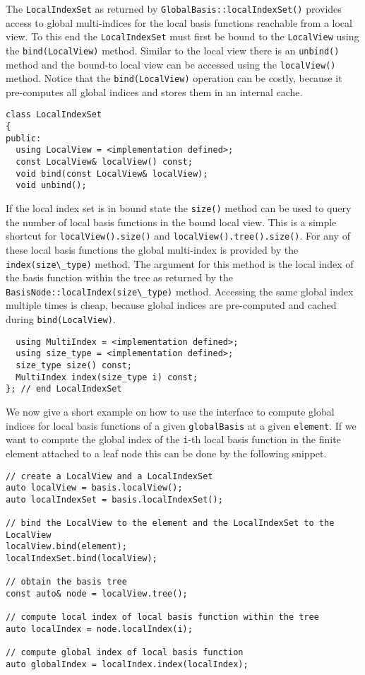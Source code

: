 \documentclass[a4paper,10pt,headings=normal,bibliography=totoc]{scrartcl}
\newcommand{\cpp}[1]{\lstinline[basicstyle=\ttfamily]!#1!}
\begin{document}
The \cpp{LocalIndexSet} as returned by \cpp{GlobalBasis::localIndexSet()}
provides access to global multi-indices for the
local basis functions reachable from a local view.
To this end the \cpp{LocalIndexSet} must
first be bound to the \cpp{LocalView} using
the \cpp{bind(LocalView)} method. Similar to the
local view there is an \cpp{unbind()} method
and the bound-to local view can be accessed
using the \cpp{localView()} method.
Notice that the \cpp{bind(LocalView)} operation
can be costly, because it pre-computes
all global indices and stores them in an internal cache.

\begin{lstlisting}
class LocalIndexSet
{
public:
  using LocalView = <implementation defined>;
  const LocalView& localView() const;
  void bind(const LocalView& localView);
  void unbind();
\end{lstlisting}

If the local index set is in bound state
the \cpp{size()} method can be used to query
the number of local basis functions in the
bound local view. This is a simple shortcut for
\cpp{localView().size()} and \cpp{localView().tree().size()}.
For any of these local basis functions the global
multi-index is provided by the \cpp{index(size\_type)}
method. The argument for this method is the local
index of the basis function within the tree as
returned by the \cpp{BasisNode::localIndex(size\_type)}
method.
Accessing the same global index multiple times
is cheap, because global indices are pre-computed
and cached during \cpp{bind(LocalView)}.

\begin{lstlisting}
  using MultiIndex = <implementation defined>;
  using size_type = <implementation defined>;
  size_type size() const;
  MultiIndex index(size_type i) const;
}; // end LocalIndexSet
\end{lstlisting}

We now give a short example on how to use the interface
to compute global indices for local basis functions
of a given \cpp{globalBasis} at a given \cpp{element}.
If we want to compute the global index of the \cpp{i}-th
local basis function in the finite element attached to
a leaf node this can be done by the following snippet.

\begin{lstlisting}
// create a LocalView and a LocalIndexSet
auto localView = basis.localView();
auto localIndexSet = basis.localIndexSet();

// bind the LocalView to the element and the LocalIndexSet to the LocalView
localView.bind(element);
localIndexSet.bind(localView);

// obtain the basis tree
const auto& node = localView.tree();

// compute local index of local basis function within the tree
auto localIndex = node.localIndex(i);

// compute global index of local basis function
auto globalIndex = localIndex.index(localIndex);
\end{lstlisting}
\end{document}
